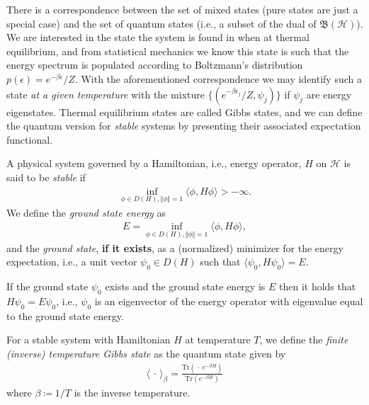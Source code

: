 There is a correspondence between the set of mixed states (pure states are just a special case)
and the set of quantum states (i.e., a subset of the dual of $\mathfrak{B}(\mathcal{H})$). We
are interested in the state the system is found in when at thermal equilibrium, and from
statistical mechanics we know this state is such that the energy spectrum is populated
according to Boltzmann's distribution $p(\epsilon)=e^{-\beta\epsilon}/Z$. With the
aforementioned correspondence we may identify such a state \textit{at a given temperature}
with the mixture $\{(e^{-\beta\epsilon_j}/Z,\psi_j)\}$ if $\psi_j$ are energy eigenstates.
Thermal equilibrium states are called Gibbs states, and we can define the quantum version for
\textit{stable} systems by presenting their associated expectation functional.

\begin{definition}
	A physical system governed by a Hamiltonian, i.e., energy operator, $H$ on $\mathcal{H}$ is
	said to be \textit{stable} if
	\begin{align*}
		\inf_{\phi\in D(H),\Vert\phi\Vert=1} \langle\phi,H\phi\rangle > -\infty.
	\end{align*}
	We define the \textit{ground state energy} as
	\begin{align*}
		E = \inf_{\phi\in D(H),\Vert\phi\Vert=1} \langle\phi,H\phi\rangle,
	\end{align*}
	and the \textit{ground state}, \textbf{if it exists}, as a (normalized) minimizer for the
	energy expectation, i.e., a unit vector $\psi_0\in D(H)$ such that $\langle\psi_0,H\psi_0
	\rangle = E$.
\end{definition}

\begin{remark}
	If the ground state $\psi_0$ exists and the ground state energy is $E$ then it holds that
	$H\psi_0 = E\psi_0$, i.e., $\psi_0$ is an eigenvector of the energy operator with
	eigenvalue equal to the ground state energy.
\end{remark}

\begin{definition}
	For a stable system with Hamiltonian $H$ at temperature $T$, we define the \textit{finite
	(inverse) temperature Gibbs state} as the quantum state given by
	\begin{align*}
		\langle\,\cdot\,\rangle_\beta = \frac{\mathrm{Tr}(\,\cdot\,e^{-\beta H})}{\mathrm{Tr}(e^{-\beta H})}
	\end{align*}
	where $\beta \coloneq 1 / T$ is the inverse temperature.
\end{definition}

